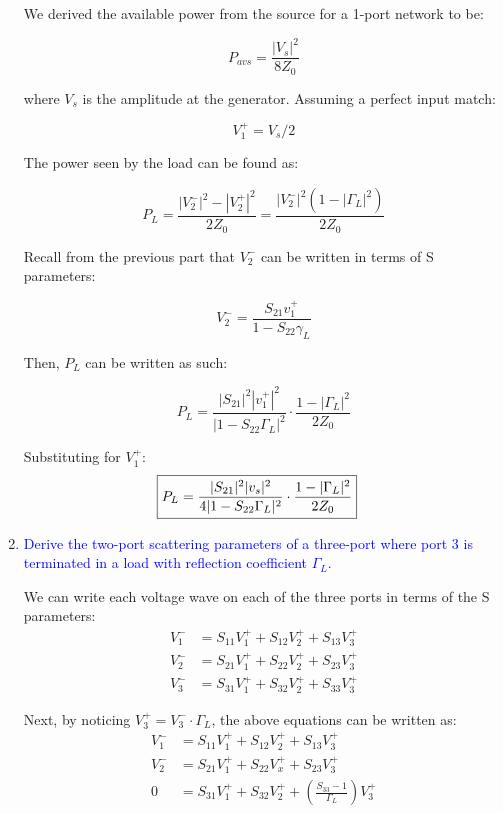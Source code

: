 \begin{enumerate}[label=(\alph*)]
    We derived the available power from the source for a 1-port network to be:

    $$ P_{avs} = \frac{|V_s|^2}{8 Z_0} $$

    where $V_s$ is the amplitude at the generator. Assuming a perfect input match:

    $$ V_1^+ = V_s / 2 $$

    The power seen by the load can be found as:

    $$ P_L = \frac{|V_2^-|^2 - |V_2^+|^2}{2 Z_0} = \frac{|V_2^-|^2(1-|\Gamma_L|^2)}{2 Z_0} $$

    Recall from the previous part that $V_2^-$ can be written in terms of S parameters:

    $$ V_2^- = \frac{S_{21} v_1^+}{1 - S_{22}\gamma_L} $$

    Then, $P_L$ can be written as such:

    $$ P_L =  \frac{|S_{21}|^2 |v_1^+|^2}{|1 - S_{22}\Gamma_L|^2} \cdot \frac{1 - |\Gamma_L|^2}{2 Z_0} $$

    Substituting for $V_1^+$:
    \begin{align*}
        \Aboxed{P_L = \frac{|S_{21}|^2 |v_s|^2}{4|1 - S_{22}\Gamma_L|^2} \cdot \frac{1 - |\Gamma_L|^2}{2 Z_0}}
    \end{align*}

    \item \textcolor{blue}{Derive the two-port scattering parameters of a three-port where port 3 is terminated in a load with reflection coefficient $\Gamma_L$.}

    We can write each voltage wave on each of the three ports in terms of the S parameters:
    \begin{align*}
        V_1^- &= S_{11}V_1^+ + S_{12}V_2^+ + S_{13}V_3^+ \\
        V_2^- &= S_{21}V_1^+ + S_{22}V_2^+ + S_{23}V_3^+ \\
        V_3^- &= S_{31}V_1^+ + S_{32}V_2^+ + S_{33}V_3^+
    \end{align*}

    Next, by noticing $V_3^+ = V_3^- \cdot \Gamma_L$, the above equations can be written as:
    \begin{align*}
        V_1^- &= S_{11}V_1^+ + S_{12}V_2^+ + S_{13}V_3^+ \\
        V_2^- &= S_{21}V_1^+ + S_{22}V_x^+ + S_{23}V_3^+ \\
        0 &= S_{31}V_1^+ + S_{32}V_2^+ + (\frac{S_{33}-1}{\Gamma_L})V_3^+
    \end{align*}


\end{enumerate}
